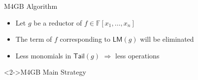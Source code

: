 \documentclass{beamer}
\newcommand{\Field}{\mathbb{F}}
\newcommand{\LM}[1]{\mathsf{LM}(#1)}
\newcommand{\Tail}[1]{\mathsf{Tail}(#1)}
\newcommand{\mpolyring}[3]{#1[#2_{1}, \ldots, #2_{#3}]}
\begin{document}
\begin{section}{M4GB Algorithm}
  
  
  \begin{frame}
    \begin{block}{}
      \begin{itemize}
      \item Let $g$ be a reductor of $f \in \mpolyring{\Field}{x}{n}$
      \item The term of $f$ corresponding to $\LM{g}$ will be
        eliminated
      \item Less monomials in $\Tail{g}$ $\Rightarrow$ less operations
      \end{itemize}
    \end{block}

    \begin{block}<2->{M4GB Main Strategy} 
    \end{block}

  \end{frame}





    

\end{section}
\end{document}
